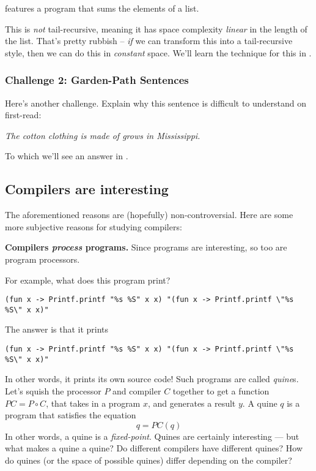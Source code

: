  features a program that sums the elements of a list.

This is \emph{not} tail-recursive, meaning it has space complexity \emph{linear} in the length of the list. That's pretty rubbish -- \emph{if} we can transform this into a tail-recursive style, then we can do this in \emph{constant} space. We'll learn the technique for this in .

\subsubsection{Challenge 2: Garden-Path Sentences}\label{section:challenge-2}
Here's another challenge. Explain why this sentence is difficult to understand on first-read:

\begin{center}
    \textit{The cotton clothing is made of grows in Mississippi.}
\end{center}

To which we'll see an answer in .

\subsection{Compilers are interesting}
The aforementioned reasons are (hopefully) non-controversial. Here are some more subjective reasons for studying compilers:

\textbf{Compilers \emph{process} programs.} Since programs are interesting, so too are program processors.

For example, what does this program \cite{drup-2018} print?

\begin{code}
\begin{verbatim}
(fun x -> Printf.printf "%s %S" x x) "(fun x -> Printf.printf \"%s %S\" x x)"
\end{verbatim}
\end{code}

The answer is that it prints 

{
\verb|(fun x -> Printf.printf "%s %S" x x) "(fun x -> Printf.printf \"%s %S\" x x)"|
}

In other words, it prints its own source code! Such programs are called \emph{quine}s. Let's squish the processor $P$ and compiler $C$ together to get a function $PC = P \circ C$, that takes in a program $x$, and generates a result $y$. A quine $q$ is a program that satisfies the equation
\[q = PC(q)\]
In other words, a quine is a \emph{fixed-point}. Quines are certainly interesting --- but what makes a quine a quine? Do different compilers have different quines? How do quines (or the space of possible quines) differ depending on the compiler?

